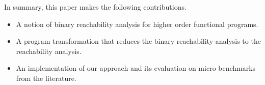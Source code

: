 In summary, this paper makes the following contributions.
%
\begin{itemize}
\item A notion of binary reachability analysis for 
  higher order functional programs.
\item A program transformation that reduces the binary
  reachability analysis to the reachability analysis.
\item An implementation of our approach and its evaluation on micro
  benchmarks from the literature.
\end{itemize}


